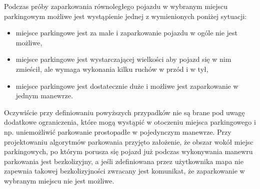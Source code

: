 \documentclass[a4paper,11pt,twoside]{report}
\theoremstyle{definition}
\begin{document}
Podczas próby zaparkowania równoległego pojazdu w wybranym miejscu parkingowym możliwe jest wystąpienie jednej z wymienionych poniżej sytuacji:
\begin{itemize}
	\item miejsce parkingowe jest za małe i zaparkowanie pojazdu w ogóle nie jest możliwe,
	\item miejsce parkingowe jest wystarczającej wielkości aby pojazd się w nim zmieścił, ale wymaga wykonania kilku ruchów w przód i w tył,
	\item miejsce parkingowe jest dostatecznie duże i możliwe jest zaparkowanie w jednym manewrze.
\end{itemize}

Oczywiście przy definiowaniu powyższych przypadków nie są brane pod uwagę dodatkowe ograniczenia, które mogą wystąpić w otoczeniu miejsca parkingowego i np. uniemożliwić parkowanie prostopadłe w pojedynczym manewrze. Przy projektowaniu algorytmów parkowania przyjęto założenie, że obszar wokół miejsc parkingowych, po którym porusza się pojazd już podczas wykonywania manewru parkowania jest bezkolizyjny, a jeśli zdefiniowana przez użytkownika mapa nie zapewnia takowej bezkolizyjności zwracany jest komunikat, że zaparkowanie w wybranym miejscu nie jest możliwe. 
\end{document}
